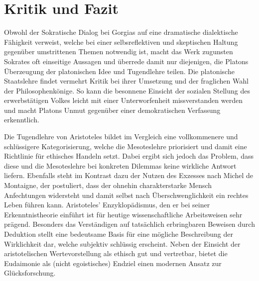\section*{Kritik und Fazit}

Obwohl der Sokratische Dialog bei Gorgias auf eine dramatische dialektische Fähigkeit verweist, 
welche bei einer selbsreflektiven und skeptischen Haltung gegenüber umstrittenen Themen notwendig ist, 
macht das Werk zugunsten Sokrates oft einseitige Aussagen und überrede damit nur diejenigen, 
die Platons Überzeugung der platonischen Idee und Tugendlehre teilen. 
Die platonische Staatslehre findet vermehrt Kritik bei ihrer Umsetzung und der fraglichen Wahl der Philosophenkönige.
So kann die besonnene Einsicht der sozialen Stellung des erwerbstätigen Volkes leicht mit einer Unterworfenheit missverstanden werden
und macht Platons Unmut gegenüber einer demokratischen Verfassung erkenntlich. 

Die Tugendlehre von Aristoteles bildet im Vergleich eine vollkommenere und schlüssigere Kategorisierung, 
welche die Mesoteslehre priorisiert und damit eine Richtlinie für ethisches Handeln setzt. 
Dabei ergibt sich jedoch das Problem, dass diese und die Mesoteslehre bei konkreten Dilemmas keine wirkliche Antwort liefern.
Ebenfalls steht im Kontrast dazu der Nutzen des Exzesses nach Michel de Montaigne, der postuliert, 
dass der ohnehin charakterstarke Mensch Anfechtungen widersteht und damit selbst nach Überschwenglichkeit ein rechtes
Leben führen kann.
Aristoteles' Enzyklopädismus, den er bei seiner Erkenntnistheorie einführt ist für heutige wissenschaftliche Arbeitsweisen sehr prägend.
Besonders das Verständigen auf tatsächlich erbringbaren Beweisen durch Deduktion stellt eine bedeutsame Basis für eine mögliche Beschreibung
der Wirklichkeit dar, welche subjektiv schlüssig erscheint. 
Neben der Einsicht der aristotelischen Wertevorstellung als ethisch gut und vertretbar, bietet die Eudaimonie als (nicht egoistisches) Endziel
einen modernen Ansatz zur Glücksforschung.
